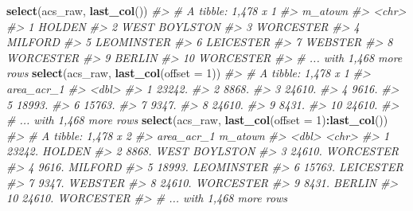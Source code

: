\documentclass[
]{book}
\newenvironment{Shaded}{\begin{snugshade}}{\end{snugshade}}
\newcommand{\CommentTok}[1]{\textcolor[rgb]{0.56,0.35,0.01}{\textit{#1}}}
\newcommand{\DataTypeTok}[1]{\textcolor[rgb]{0.13,0.29,0.53}{#1}}
\newcommand{\DecValTok}[1]{\textcolor[rgb]{0.00,0.00,0.81}{#1}}
\newcommand{\KeywordTok}[1]{\textcolor[rgb]{0.13,0.29,0.53}{\textbf{#1}}}
\newcommand{\NormalTok}[1]{#1}
\newcommand{\OperatorTok}[1]{\textcolor[rgb]{0.81,0.36,0.00}{\textbf{#1}}}
\begin{document}
\begin{Shaded}
\begin{Highlighting}[]
\KeywordTok{select}\NormalTok{(acs\_raw, }\KeywordTok{last\_col}\NormalTok{())}
\CommentTok{\#\textgreater{} \# A tibble: 1,478 x 1}
\CommentTok{\#\textgreater{}    m\_atown      }
\CommentTok{\#\textgreater{}    \textless{}chr\textgreater{}        }
\CommentTok{\#\textgreater{}  1 HOLDEN       }
\CommentTok{\#\textgreater{}  2 WEST BOYLSTON}
\CommentTok{\#\textgreater{}  3 WORCESTER    }
\CommentTok{\#\textgreater{}  4 MILFORD      }
\CommentTok{\#\textgreater{}  5 LEOMINSTER   }
\CommentTok{\#\textgreater{}  6 LEICESTER    }
\CommentTok{\#\textgreater{}  7 WEBSTER      }
\CommentTok{\#\textgreater{}  8 WORCESTER    }
\CommentTok{\#\textgreater{}  9 BERLIN       }
\CommentTok{\#\textgreater{} 10 WORCESTER    }
\CommentTok{\#\textgreater{} \# ... with 1,468 more rows}
\KeywordTok{select}\NormalTok{(acs\_raw, }\KeywordTok{last\_col}\NormalTok{(}\DataTypeTok{offset =} \DecValTok{1}\NormalTok{))}
\CommentTok{\#\textgreater{} \# A tibble: 1,478 x 1}
\CommentTok{\#\textgreater{}    area\_acr\_1}
\CommentTok{\#\textgreater{}         \textless{}dbl\textgreater{}}
\CommentTok{\#\textgreater{}  1     23242.}
\CommentTok{\#\textgreater{}  2      8868.}
\CommentTok{\#\textgreater{}  3     24610.}
\CommentTok{\#\textgreater{}  4      9616.}
\CommentTok{\#\textgreater{}  5     18993.}
\CommentTok{\#\textgreater{}  6     15763.}
\CommentTok{\#\textgreater{}  7      9347.}
\CommentTok{\#\textgreater{}  8     24610.}
\CommentTok{\#\textgreater{}  9      8431.}
\CommentTok{\#\textgreater{} 10     24610.}
\CommentTok{\#\textgreater{} \# ... with 1,468 more rows}
\KeywordTok{select}\NormalTok{(acs\_raw, }\KeywordTok{last\_col}\NormalTok{(}\DataTypeTok{offset =} \DecValTok{1}\NormalTok{)}\OperatorTok{:}\KeywordTok{last\_col}\NormalTok{())}
\CommentTok{\#\textgreater{} \# A tibble: 1,478 x 2}
\CommentTok{\#\textgreater{}    area\_acr\_1 m\_atown      }
\CommentTok{\#\textgreater{}         \textless{}dbl\textgreater{} \textless{}chr\textgreater{}        }
\CommentTok{\#\textgreater{}  1     23242. HOLDEN       }
\CommentTok{\#\textgreater{}  2      8868. WEST BOYLSTON}
\CommentTok{\#\textgreater{}  3     24610. WORCESTER    }
\CommentTok{\#\textgreater{}  4      9616. MILFORD      }
\CommentTok{\#\textgreater{}  5     18993. LEOMINSTER   }
\CommentTok{\#\textgreater{}  6     15763. LEICESTER    }
\CommentTok{\#\textgreater{}  7      9347. WEBSTER      }
\CommentTok{\#\textgreater{}  8     24610. WORCESTER    }
\CommentTok{\#\textgreater{}  9      8431. BERLIN       }
\CommentTok{\#\textgreater{} 10     24610. WORCESTER    }
\CommentTok{\#\textgreater{} \# ... with 1,468 more rows}
\end{Highlighting}
\end{Shaded}
\end{document}
